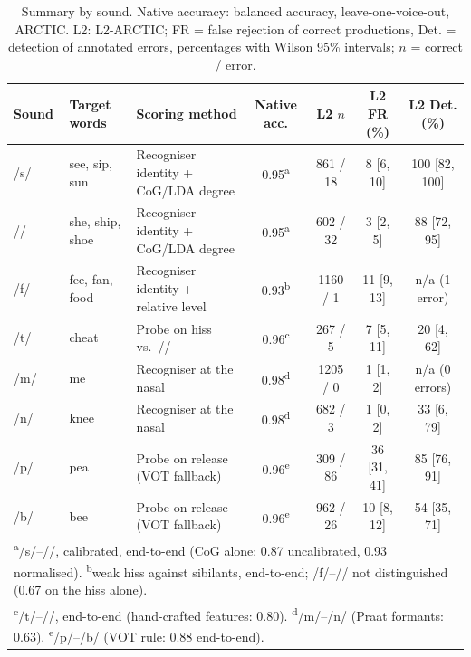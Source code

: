 \documentclass[conference]{IEEEtran}
\newcommand{\ipa}[1]{/#1/}
\begin{document}
\begin{table}[!t]
\caption{Summary by sound. Native accuracy: balanced accuracy, leave-one-voice-out, ARCTIC. L2: L2-ARCTIC; FR = false rejection of correct productions, Det. = detection of annotated errors, percentages with Wilson 95\% intervals; $n$ = correct / error.}
\label{tab:summary}
\centering
\footnotesize
\begin{tabular}{lllcccc}
\toprule
Sound & Target words & Scoring method & Native acc. & L2 $n$ & L2 FR (\%) & L2 Det. (\%) \\
\midrule
\ipa{s} & see, sip, sun & Recogniser identity + CoG/LDA degree & 0.95\textsuperscript{a} & 861 / 18 & 8 [6, 10] & 100 [82, 100] \\
\ipa{\textesh} & she, ship, shoe & Recogniser identity + CoG/LDA degree & 0.95\textsuperscript{a} & 602 / 32 & 3 [2, 5] & 88 [72, 95] \\
\ipa{f} & fee, fan, food & Recogniser identity + relative level & 0.93\textsuperscript{b} & 1160 / 1 & 11 [9, 13] & n/a (1 error) \\
\ipa{t\textesh} & cheat & Probe on hiss vs.\ \ipa{\textesh} & 0.96\textsuperscript{c} & 267 / 5 & 7 [5, 11] & 20 [4, 62] \\
\ipa{m} & me & Recogniser at the nasal & 0.98\textsuperscript{d} & 1205 / 0 & 1 [1, 2] & n/a (0 errors) \\
\ipa{n} & knee & Recogniser at the nasal & 0.98\textsuperscript{d} & 682 / 3 & 1 [0, 2] & 33 [6, 79] \\
\ipa{p} & pea & Probe on release (VOT fallback) & 0.96\textsuperscript{e} & 309 / 86 & 36 [31, 41] & 85 [76, 91] \\
\ipa{b} & bee & Probe on release (VOT fallback) & 0.96\textsuperscript{e} & 962 / 26 & 10 [8, 12] & 54 [35, 71] \\
\bottomrule
\multicolumn{7}{l}{\scriptsize \textsuperscript{a}\ipa{s}--\ipa{\textesh}, calibrated, end-to-end (CoG alone: 0.87 uncalibrated, 0.93 normalised). \textsuperscript{b}weak hiss against sibilants, end-to-end; \ipa{f}--\ipa{\texttheta} not distinguished (0.67 on the hiss alone).} \\
\multicolumn{7}{l}{\scriptsize \textsuperscript{c}\ipa{t\textesh}--\ipa{\textesh}, end-to-end (hand-crafted features: 0.80). \textsuperscript{d}\ipa{m}--\ipa{n} (Praat formants: 0.63). \textsuperscript{e}\ipa{p}--\ipa{b} (VOT rule: 0.88 end-to-end).} \\
\end{tabular}
\end{table}
\end{document}
